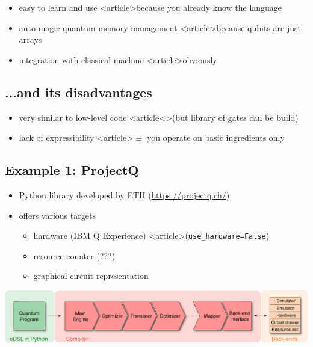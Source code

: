 \documentclass[a4paper,11pt]{article}
\begin{document}
\begin{itemize}
\item easy to learn and use <article>{because you already know 
the language}
\item auto-magic quantum memory management <article>{because 
qubits are just arrays}
\item integration with classical machine
<article>{obviously}
\end{itemize}


\subsection{...and its disadvantages}

\begin{itemize}
\item very similar to low-level code <article<>{(but library 
of gates can be build)}
\item lack of expressibility <article>{$\equiv$ you operate on 
basic ingredients only}
\end{itemize}


\subsection{Example 1: ProjectQ}


\begin{itemize}
\item Python library developed by ETH (\url{https://projectq.ch/})
\item offers various targets
\begin{itemize}
\item hardware (IBM Q Experience) 
<article>{(\verb|use_hardware=False|)}
\item resource counter (???)
\item graphical circuit representation
\end{itemize}
\end{itemize}




\includegraphics[width=\textwidth]{../slides/pics/projectq-compiler-overview.png}\\
\end{document}
